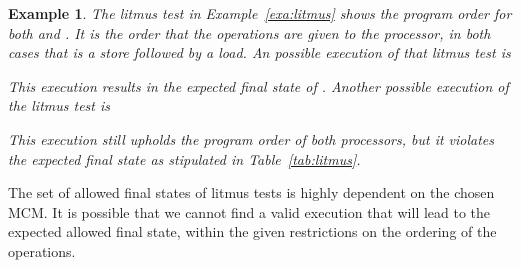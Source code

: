 \documentclass[runningheads]{llncs}
\newtheorem{exa}{Example}
\begin{document}
\begin{exa}
\label{exa:litmus2}
The litmus test in Example~\ref{exa:litmus} shows the program order for both {} and {}.
It is the order that the operations are given to the processor, in both cases that is a store followed by a load.
An possible execution of that litmus test is
\begin{table}[H]
\begin{center}
{}
\end{center}
\end{table}
\vspace{-1cm}

This execution results in the expected final state of {}.
Another possible execution of the litmus test is
\begin{table}[H]
\begin{center}
{}
\end{center}
\end{table}
\vspace{-1cm}

This execution still upholds the program order of both processors, but it violates the expected final state as stipulated in Table~\ref{tab:litmus}.
\end{exa}

The set of allowed final states of litmus tests is highly dependent on the chosen MCM.
It is possible that we cannot find a valid execution that will lead to the expected allowed final state, within the given restrictions on the ordering of the operations.
\end{document}
